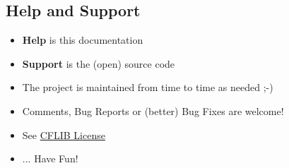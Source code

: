 \hypertarget{index_help}{}\subsection{Help and Support}\label{index_help}
\begin{itemize}
\item {\bf Help} is this documentation\item {\bf Support} is the (open) source code\item The project is maintained from time to time as needed ;-)\item Comments, Bug Reports or (better) Bug Fixes are welcome!\item See \hyperlink{license}{CFLIB License}\item ... Have Fun! \end{itemize}
